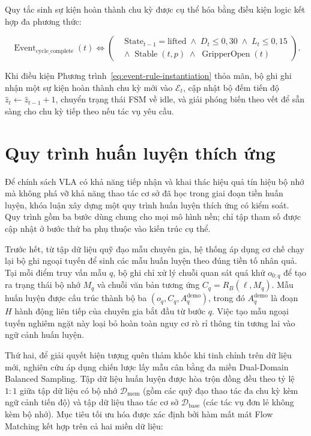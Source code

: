 Quy tắc sinh sự kiện hoàn thành chu kỳ được cụ thể hóa bằng điều kiện logic kết hợp đa phương thức:

\begin{equation}
\operatorname{Event}_{\mathrm{cycle\_complete}}(t) \iff
\left(
\begin{aligned}
&\text{State}_{t-1} = \text{lifted} \;\land\; D_t \le 0{,}30 \;\land\; L_t \le 0{,}15 \\
&\land\; \operatorname{Stable}(t, p) \;\land\; \operatorname{GripperOpen}(t)
\end{aligned}
\right).
\label{eq:event-rule-instantiation}
\end{equation}

Khi điều kiện Phương trình~\eqref{eq:event-rule-instantiation} thỏa mãn, bộ ghi ghi nhận một sự kiện hoàn thành chu kỳ mới vào $\mathcal E_t$, cập nhật bộ đếm tiến độ $\hat z_t \leftarrow \hat z_{t-1} + 1$, chuyển trạng thái FSM về $\text{idle}$, và giải phóng biến theo vết để sẵn sàng cho chu kỳ tiếp theo nếu tác vụ yêu cầu.

\section{Quy trình huấn luyện thích ứng}
\label{sec:adaptation}

Để chính sách VLA có khả năng tiếp nhận và khai thác hiệu quả tín hiệu bộ nhớ mà không phá vỡ khả năng thao tác cơ sở đã học trong giai đoạn tiền huấn luyện, khóa luận xây dựng một quy trình huấn luyện thích ứng có kiểm soát. Quy trình gồm ba bước dùng chung cho mọi mô hình nền; chỉ tập tham số được cập nhật ở bước thứ ba phụ thuộc vào kiến trúc cụ thể.

Trước hết, từ tập dữ liệu quỹ đạo mẫu chuyên gia, hệ thống áp dụng cơ chế chạy lại bộ ghi ngoại tuyến để sinh các mẫu huấn luyện theo đúng tiền tố nhân quả. Tại mỗi điểm truy vấn mẫu $q$, bộ ghi chỉ xử lý chuỗi quan sát quá khứ $o_{0:q}$ để tạo ra trạng thái bộ nhớ $M_q$ và chuỗi văn bản tương ứng $C_q = R_B(\ell, M_q)$. Mẫu huấn luyện được cấu trúc thành bộ ba $(o_q, C_q, A_q^{\mathrm{demo}})$, trong đó $A_q^{\mathrm{demo}}$ là đoạn $H$ hành động liên tiếp của chuyên gia bắt đầu từ bước $q$. Việc tạo mẫu ngoại tuyến nghiêm ngặt này loại bỏ hoàn toàn nguy cơ rò rỉ thông tin tương lai vào ngữ cảnh huấn luyện.

Thứ hai, để giải quyết hiện tượng quên thảm khốc khi tinh chỉnh trên dữ liệu mới, nghiên cứu áp dụng chiến lược lấy mẫu cân bằng đa miền Dual-Domain Balanced Sampling. Tập dữ liệu huấn luyện được hòa trộn đồng đều theo tỷ lệ $1:1$ giữa tập dữ liệu có bộ nhớ $\mathcal D_{\mathrm{mem}}$ (gồm các quỹ đạo thao tác đa chu kỳ kèm ngữ cảnh tiến độ) và tập dữ liệu thao tác cơ sở $\mathcal D_{\mathrm{base}}$ (các tác vụ đơn lẻ không kèm bộ nhớ). Mục tiêu tối ưu hóa được xác định bởi hàm mất mát Flow Matching kết hợp trên cả hai miền dữ liệu:

